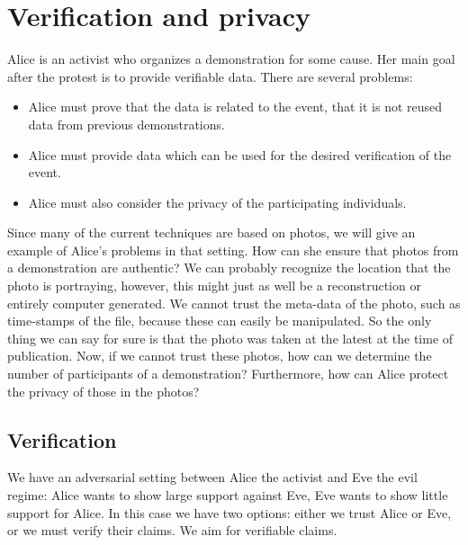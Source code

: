 \mode*
\section{Verification and privacy}

Alice is an activist who organizes a demonstration for some cause.
Her main goal after the protest is to provide verifiable data.
There are several problems:
\begin{frame}
\begin{itemize}
  \item Alice must prove that the data is related to the event, that it is not 
    reused data from previous demonstrations.
  \item Alice must provide data which can be used for the desired verification 
    of the event.
  \item Alice must also consider the privacy of the participating individuals.
\end{itemize}
\end{frame}
Since many of the current techniques are based on photos, we will give an 
example of Alice's problems in that setting.
How can she ensure that photos from a demonstration are authentic?
We can probably recognize the location that the photo is portraying, however, 
this might just as well be a reconstruction or entirely computer generated.
We cannot trust the meta-data of the photo, such as time-stamps of the file, 
because these can easily be manipulated.
So the only thing we can say for sure is that the photo was taken at the latest 
at the time of publication.
Now, if we cannot trust these photos, how can we determine the number of 
participants of a demonstration?
Furthermore, how can Alice protect the privacy of those in the photos?

\subsection{Verification}
\label{Verification}

We have an adversarial setting between Alice the activist and Eve the evil 
regime: Alice wants to show large support against Eve, Eve wants to show little
support for Alice.
In this case we have two options:
either we trust Alice or Eve, or we must verify their claims.
We aim for verifiable claims.

